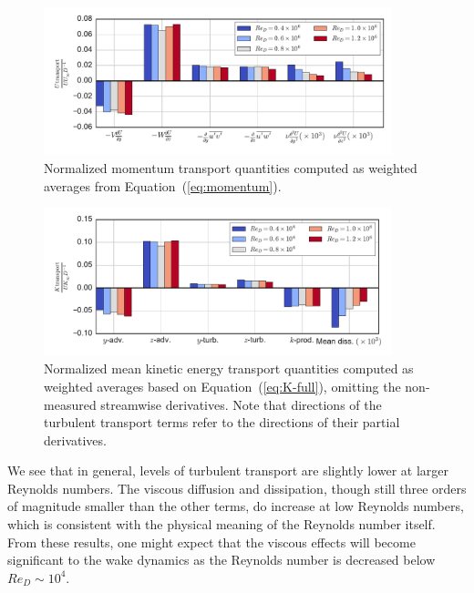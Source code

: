 \documentclass[energies,article,accept,moreauthors,pdftex,10pt,a4paper]{mdpi}
\theoremstyle{mdpi}
\newcounter{ex}
\newcounter{re}
\begin{document}
\begin{figure}[H]
 \centering
 
 \includegraphics[width=0.9\textwidth]{figures/mom_bar_graph}
 
 \caption{Normalized momentum transport quantities computed as weighted
 averages from Equation~(\ref{eq:momentum}).}
 
 \label{fig:mom-bar-graph}
\end{figure}

\begin{figure}[H]
 \centering
 
 \includegraphics[width=0.9\textwidth]{figures/K_trans_bar_graph}
 
 \caption{Normalized mean kinetic energy transport quantities computed as
 weighted averages based on Equation~(\ref{eq:K-full}), omitting the
 non-measured streamwise derivatives. Note that directions of the turbulent
 transport terms refer to the directions of their partial derivatives.}
 
 \label{fig:K-bar-graph}
\end{figure}

We see that in general, levels of turbulent transport are slightly lower at
larger Reynolds numbers. The viscous diffusion and dissipation, though still
three orders of magnitude smaller than the other terms, do increase at low
Reynolds numbers, which is consistent with the physical meaning of the Reynolds
number itself. From these results, one might expect that the viscous effects will
become significant to the wake dynamics as the Reynolds number is decreased below
$Re_D \sim 10^4$.
\end{document}

